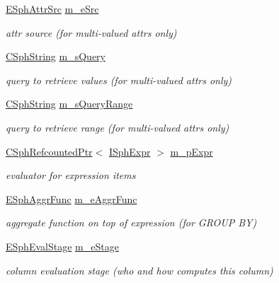 \begin{DoxyCompactItemize}
\hyperlink{sphinx_8h_a12f94ed24e910d07293d589938013df9}{E\-Sph\-Attr\-Src} \hyperlink{structCSphColumnInfo_afe3902493f80436499d412c0f24b5d77}{m\-\_\-e\-Src}
\begin{DoxyCompactList}\small\item\em attr source (for multi-\/valued attrs only) \end{DoxyCompactList}\item 
\hyperlink{structCSphString}{C\-Sph\-String} \hyperlink{structCSphColumnInfo_a699eab7d433023dd1566699496006457}{m\-\_\-s\-Query}
\begin{DoxyCompactList}\small\item\em query to retrieve values (for multi-\/valued attrs only) \end{DoxyCompactList}\item 
\hyperlink{structCSphString}{C\-Sph\-String} \hyperlink{structCSphColumnInfo_ab115d56d74ce42d937c1fd785411c00e}{m\-\_\-s\-Query\-Range}
\begin{DoxyCompactList}\small\item\em query to retrieve range (for multi-\/valued attrs only) \end{DoxyCompactList}\item 
\hyperlink{classCSphRefcountedPtr}{C\-Sph\-Refcounted\-Ptr}$<$ \hyperlink{structISphExpr}{I\-Sph\-Expr} $>$ \hyperlink{structCSphColumnInfo_a552429a383e387ec79a70899e0444d0c}{m\-\_\-p\-Expr}
\begin{DoxyCompactList}\small\item\em evaluator for expression items \end{DoxyCompactList}\item 
\hyperlink{sphinx_8h_a92532037c3ec9dad4a636e957fff58c9}{E\-Sph\-Aggr\-Func} \hyperlink{structCSphColumnInfo_a5426129bbf0e925048f14f741fec79e4}{m\-\_\-e\-Aggr\-Func}
\begin{DoxyCompactList}\small\item\em aggregate function on top of expression (for G\-R\-O\-U\-P B\-Y) \end{DoxyCompactList}\item 
\hyperlink{sphinxexpr_8h_ae5eb5e13e926842882703cd0bd53ee46}{E\-Sph\-Eval\-Stage} \hyperlink{structCSphColumnInfo_aeeba6f3600e5aad690b1fbcc104eb163}{m\-\_\-e\-Stage}
\begin{DoxyCompactList}\small\item\em column evaluation stage (who and how computes this column) \end{DoxyCompactList}\item 

\end{DoxyCompactItemize}
